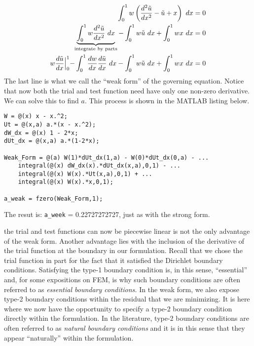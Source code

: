 \begin{align*}
\int_{0}^{1} w \left(\frac{d^2 \tilde{u}}{dx^2}-\tilde{u}+x \right) \ dx &= 0 \\
\underbrace{\int_{0}^{1} w \frac{d^2 \tilde{u}}{dx^2} \ dx}_{\text{integrate by parts}} - \int_{0}^{1} w \tilde{u} \ dx + \int_{0}^{1}wx \ dx &= 0 \\
w \frac{d\tilde{u}}{dx}\Bigl|_0^1 - \int_{0}^{1}\frac{dw}{dx}\frac{d\tilde{u}}{dx}\ dx - \int_{0}^{1} w \tilde{u} \ dx + \int_{0}^{1}wx \ dx &= 0 \\
\end{align*}
The last line is what we call the ``weak form'' of the governing equation.  Notice that now both the trial and test function need have only one non-zero derivative.  We can solve this to find $a$.  This process is shown in the MATLAB listing below.

\begin{lstlisting}[style=myMatlab,name=lec33n-weak-form]
%% Weak Form
W = @(x) x - x.^2;
Ut = @(x,a) a.*(x - x.^2);
dW_dx = @(x) 1 - 2*x;
dUt_dx = @(x,a) a.*(1-2*x);

Weak_Form = @(a) W(1)*dUt_dx(1,a) - W(0)*dUt_dx(0,a) - ... 
    integral(@(x) dW_dx(x).*dUt_dx(x,a),0,1) - ...
    integral(@(x) W(x).*Ut(x,a),0,1) + ...
    integral(@(x) W(x).*x,0,1);

a_weak = fzero(Weak_Form,1);
\end{lstlisting}
The resut is: \lstinline[style=myMatlab]{a_week} = 0.22727272727, just as with the strong form.

 the trial and test functions can now be piecewise linear is not the only advantage of the weak form.  Another advantage lies with the inclusion of the derivative of the trial function at the boundary in our formulation. Recall that we chose the trial function in part for the fact that it satisfied the Dirichlet boundary conditions.  Satisfying the type-1 boundary condition is, in this sense, ``essential'' and, for some expositions on FEM, is why such boundary conditions are often referred to as \emph{essential boundary conditions.}  In the weak form, we also expose type-2 boundary conditions within the residual that we are minimizing.  It is here where we now have the opportunity to specify a type-2 boundary condition directly within the formulation.  In the literature, type-2 boundary conditions are often referred to as \emph{natural boundary conditions} and it is in this sense that they appear ``naturally'' within the formulation. 
 


